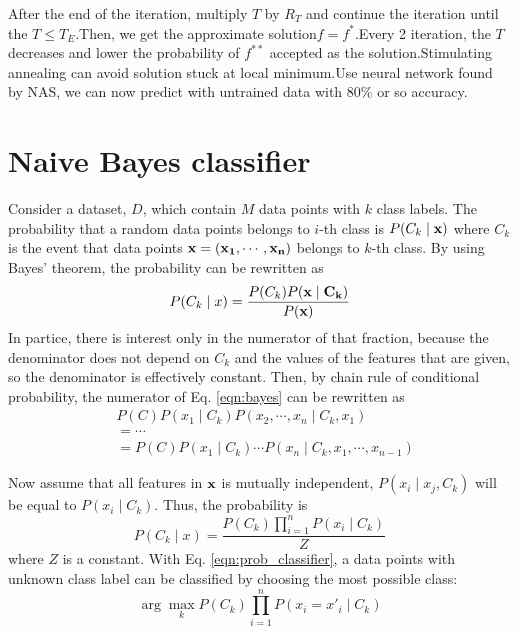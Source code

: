 \documentclass[twocolumn,10pt]{article}
\begin{document}
  After the end of the iteration, multiply $T$ by $R_T$ and continue the iteration until the $T \le T_E$.Then, we get the approximate 
  solution$f=f^*$.Every 2 iteration, the $T$ decreases and lower the probability of $f^{**}$ accepted as the solution.Stimulating annealing 
  can avoid solution stuck at local minimum.Use neural network found by NAS, we can now predict with untrained data with $80\%$ or so accuracy.

\section{Naive Bayes classifier}
  Consider a dataset, $D$, which contain $M$ data points with $k$ class labels. The probability that a random data points belongs to 
  $i$-th class is $P(C_k\mid \bf{x})$ where $C_k$ is the event that data points $\bf{x}=(x_1,\cdots,x_n)$ belongs to $k$-th class.
  By using Bayes' theorem, the probability can be rewritten as 
  \begin{equation}
    \label{eqn:bayes}
    P(C_k\mid x)=\frac{P(C_k)P(\bf{x}\mid C_k)}{P(\bf{x})}
  \end{equation}
  In partice, 
  there is interest only in the numerator of that fraction, because the denominator does not depend on $C_k$ and the values of the 
  features that are given, so the denominator is effectively constant. 
  Then, by chain rule of conditional probability, the numerator of Eq. \ref{eqn:bayes} can be rewritten as
  \begin{equation}
    \label{eqn:rebayes}
    \begin{split}
      &P(C)P(x_1\mid C_k)P(x_2,\cdots,x_n\mid C_k,x_1)
      \\&=\cdots
      \\&=P(C)P(x_1\mid C_k)\cdots P(x_n\mid C_k,x_1,\cdots,x_{n-1})
    \end{split}
  \end{equation}

  Now assume that all features in $\bf{x}$ is mutually independent, $P(x_i\mid x_j, C_k)$ will be equal to $P(x_i\mid C_k)$. 
  Thus, the probability is 
  \begin{equation}
    \label{eqn:prob_classifier}
    P(C_k\mid x)=\frac{P(C_k)\prod^n_{i=1}P(x_i\mid C_k)}{Z}
  \end{equation}
  where $Z$ is a constant. 
  With Eq. \ref{eqn:prob_classifier}, a data points with unknown class label can be classified by choosing the most possible class: 
  \begin{equation}
    \label{eqn:classifier}
    \arg\max_k P(C_k)\prod^n_{i=1}P(x_i=x'_i\mid C_k)
  \end{equation}
\end{document}
